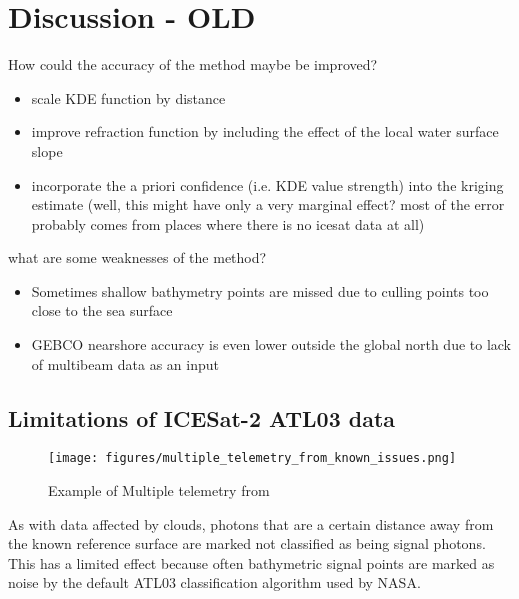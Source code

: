 \chapter{Discussion - OLD}

How could the accuracy of the method maybe be improved?
\begin{itemize}
    \item scale KDE function by distance 
    \item improve refraction function by including the effect of the local water surface slope
    \item incorporate the a priori confidence (i.e. KDE value strength) into the kriging estimate (well, this might have only a very marginal effect? most of the error probably comes from places where there is no icesat data at all) 
\end{itemize}

what are some weaknesses of the method?

\begin{itemize}
    \item Sometimes shallow bathymetry points are missed due to culling points too close to the sea surface
    \item GEBCO nearshore accuracy is even lower outside the global north due to lack of multibeam data as an input 
\end{itemize}


\section{Limitations of ICESat-2 ATL03 data}
\begin{figure}[h!]
    \centering
    \texttt{[image: figures/multiple\_telemetry\_from\_known\_issues.png]}
    \caption{Example of Multiple telemetry from \cite{atl03knownissues}}
    \label{fig:multiple_tel_bands}
\end{figure}

As with data affected by clouds, photons that are a certain distance away from the known reference surface are marked not classified as being signal photons. This has a limited effect because often bathymetric signal points are marked as noise by the default ATL03 classification algorithm used by NASA. 

